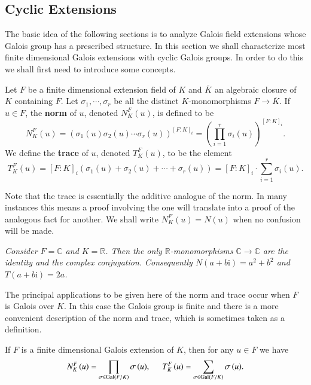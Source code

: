 \subsection{Cyclic Extensions}
The basic idea of the following sections is to analyze Galois field extensions whose Galois group has a prescribed structure. In this section we shall characterize most finite dimensional Galois extensions with cyclic Galois groups. In order to do this we shall first need to introduce some concepts.
\begin{definition}
Let $F$ be a finite dimensional extension field of $K$ and $\overline{K}$ an algebraic closure of $K$ containing $F$. Let $\sigma_1,\cdots,\sigma_r$ be all the distinct $K$-monomorphisms $F\to\overline{K}$. If $u\in F$, the \textbf{norm} of $u$, denoted $N_K^F(u)$, is defined to be 
$$
N_{K}^{F}\left( u \right) =\left( \sigma _1\left( u \right) \sigma _2\left( u \right) \cdots \sigma _r\left( u \right) \right) ^{\left[ F:K \right] _i}=\left( \prod_{i=1}^r{\sigma _i\left( u \right)} \right) ^{\left[ F:K \right] _i}.
$$
We define the \textbf{trace} of $u$, denoted $T_K^F(u)$, to be the element 
$$
T_{K}^{F}\left( u \right) =\left[ F:K \right] _i\left( \sigma _1\left( u \right) +\sigma _2\left( u \right) +\cdots +\sigma _r\left( u \right) \right) =\left[ F:K \right] _i\cdot \sum_{i=1}^r{\sigma _i\left( u \right)}.
$$
\end{definition}
Note that the trace is essentially the additive analogue of the norm. In many instances this means a proof involving the one will translate into a proof of the analogous fact for another. We shall write $N_K^F(u)=N(u)$ when no confusion will be made.
\begin{example}\em
Consider $F=\mathbb{C}$ and $K=\mathbb{R}$. Then the only $\mathbb{R}$-monomorphisms $\mathbb{C}\to\mathbb{C}$ are the identity and the complex conjugation. Consequently $N(a+b\mathrm{i})=a^2+b^2$ and $T(a+b\mathrm{i})=2a$.
\end{example}
The principal applications to be given here of the norm and trace occur when $F$ is Galois over $K$. In this case the Galois group is finite and there is a more convenient description of the norm and trace, which is sometimes taken as a definition.
\begin{theorem}
If $F$ is a finite dimensional Galois extension of $K$, then for any $u\in F$ we have 
$$
N_{K}^{F}\left( u \right) =\prod_{\sigma \in \mathrm{Gal}\left( F/K \right)}{\sigma \left( u \right)},\hspace{0.5cm}T_{K}^{F}\left( u \right) =\sum_{\sigma \in \mathrm{Gal}\left( F/K \right)}{\sigma \left( u \right)}.
$$
\end{theorem}
